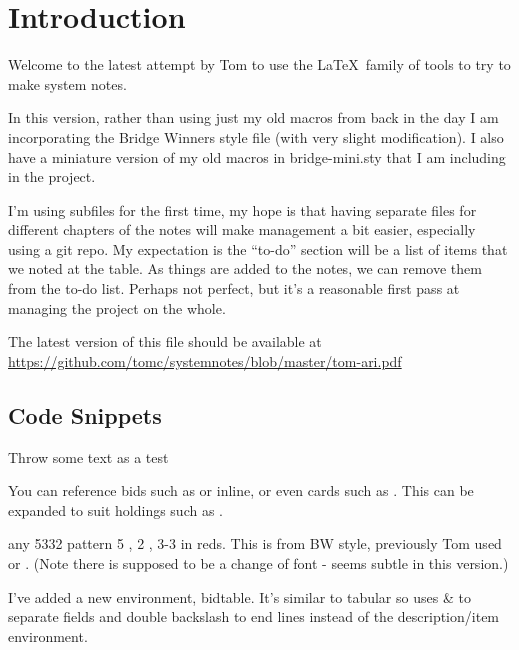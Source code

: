 \documentclass[tom-ari]{subfile}
\begin{document}
\chapter{Introduction}

Welcome to the latest attempt by Tom to use the \LaTeX~family of tools to try to make system notes.  

In this version, rather than using just my old macros from back in the day I am incorporating the Bridge Winners style file (with very slight modification).  I also have a miniature version of my old macros in bridge-mini.sty that I am including in the project.

I'm using subfiles for the first time, my hope is that having separate files for different chapters of the notes will make management a bit easier, especially using a git repo.  
My expectation is the ``to-do'' section will be a list of items that we noted at the table.  As things are added to the notes, we can remove them from the to-do list.  Perhaps not perfect, but it's a reasonable first pass at managing the project on the whole.

The latest version of this file should be available at \url{https://github.com/tomc/systemnotes/blob/master/tom-ari.pdf}

\section{Code Snippets}

Throw some text as a test


You can reference bids such as    or  inline, or even cards such as    . This can be expanded to suit holdings such as .

 any 5332 pattern
 5 \spadesuit, 2 \clubsuit, 3-3 in reds.  This is from BW style, previously Tom used  or .  (Note there is supposed to be a change of font - seems subtle in this version.) 




I've added a new environment, bidtable.  It's similar to tabular so uses \& to separate fields and double backslash to end lines instead of the description/item environment.
\end{document}
